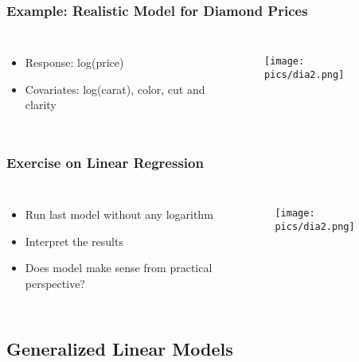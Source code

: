 \documentclass[
    utf8,
    aspectratio=169
]{beamer}  %
\begin{document}
\begin{frame}
	\frametitle{Example: Realistic Model for Diamond Prices}
	\begin{columns}
		\begin{itemize}
			\item Response: log(price)
			\item Covariates: log(carat), color, cut and clarity
		\end{itemize}
	
		\begin{figure}
			\texttt{[image: pics/dia2.png]}
		\end{figure}
	\end{columns}
\end{frame}

\begin{frame}
	\frametitle{Exercise on Linear Regression}
	\begin{columns}
		\column{0.55\textwidth}
		\begin{itemize}
			\item Run last model without any logarithm
			\item Interpret the results
			\item Does model make sense from practical perspective?
		\end{itemize}
		\column{0.35\textwidth}
		\begin{figure}
			\texttt{[image: pics/dia2.png]}
		\end{figure}
	\end{columns}
\end{frame}

\subsection{Generalized Linear Models}
\end{document}

